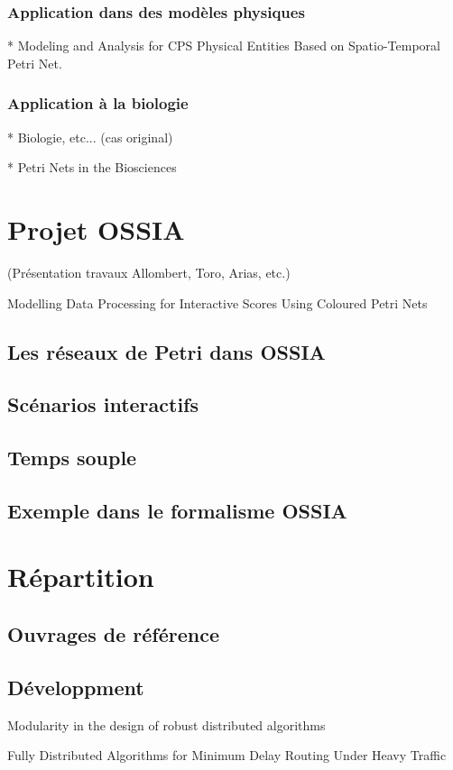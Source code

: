 \subsubsection{Application dans des modèles physiques}
* Modeling and Analysis for CPS Physical Entities Based on Spatio-Temporal Petri Net.
\subsubsection{Application à la biologie}
* Biologie, etc... (cas original)

* Petri Nets in the Biosciences

\section{Projet OSSIA}
(Présentation travaux Allombert, Toro, Arias, etc.)

Modelling Data Processing for Interactive Scores Using Coloured Petri Nets
\subsection{Les réseaux de Petri dans OSSIA}
\subsection{Scénarios interactifs}
\subsection{Temps souple}
\subsection{Exemple dans le formalisme OSSIA}

\section{Répartition}
\subsection{Ouvrages de référence}
\cite{lynch1996distributed}

\subsection{Développment}
Modularity in the design of robust distributed algorithms

Fully Distributed Algorithms for Minimum Delay Routing Under Heavy Traffic 

